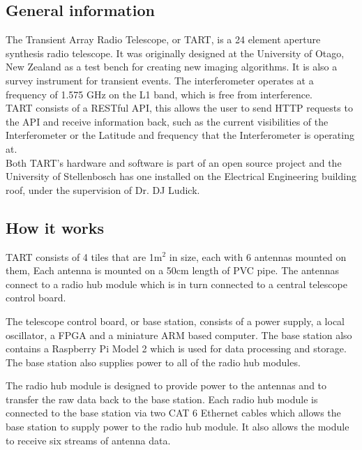 \subsection{General information}
The Transient Array Radio Telescope, or TART, is a 24 element aperture synthesis radio telescope. It was originally designed at the University of Otago, New Zealand as a test bench for creating new imaging algorithms. It is also a survey instrument for transient events\cite{DESIGN_TART}. The interferometer operates at a frequency of 1.575 GHz on the L1 band, which is free from interference.
\\
TART consists of a RESTful API, this allows the user to send HTTP requests to the API and receive information back, such as the current visibilities of the Interferometer or the Latitude and frequency that the Interferometer is operating at.\cite{CALIBRATION_TART}\\
Both TART's hardware and software is part of an open source project and the University of Stellenbosch has one installed on the Electrical Engineering building roof, under the supervision of Dr. DJ Ludick.

\subsection{How it works}
TART consists of 4 tiles that are 1m$^2$ in size, each with 6 antennas mounted on them, Each antenna is mounted on a 50cm length of PVC pipe. The antennas connect to a radio hub module which is in turn connected to a central telescope control board\cite{LAYOUT_TART}.

The telescope control board, or base station, consists of a power supply, a local oscillator, a FPGA and a miniature ARM based computer. The base station also contains a Raspberry Pi Model 2 which is used for data processing and storage. The base station also supplies power to all of the radio hub modules\cite{CALIBRATION_AND_SYNTHESIS_TART}.

The radio hub module is designed to provide power to the antennas and to transfer the raw data back to the base station. Each radio hub module is connected to the base station via two CAT 6 Ethernet cables which allows the base station to supply power to the radio hub module. It also  allows the module to receive six streams of antenna data\cite{CALIBRATION_AND_SYNTHESIS_TART}.

